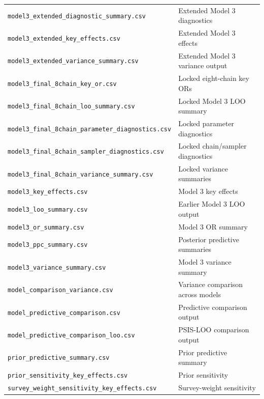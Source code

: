 \begin{longtable}{p{}p{}}
\texttt{model3\_extended\_diagnostic\_summary.csv} & Extended Model 3 diagnostics \\
\texttt{model3\_extended\_key\_effects.csv} & Extended Model 3 effects \\
\texttt{model3\_extended\_variance\_summary.csv} & Extended Model 3 variance output \\
\texttt{model3\_final\_8chain\_key\_or.csv} & Locked eight-chain key ORs \\
\texttt{model3\_final\_8chain\_loo\_summary.csv} & Locked Model 3 LOO summary \\
\texttt{model3\_final\_8chain\_parameter\_diagnostics.csv} & Locked parameter diagnostics \\
\texttt{model3\_final\_8chain\_sampler\_diagnostics.csv} & Locked chain/sampler diagnostics \\
\texttt{model3\_final\_8chain\_variance\_summary.csv} & Locked variance summaries \\
\texttt{model3\_key\_effects.csv} & Model 3 key effects \\
\texttt{model3\_loo\_summary.csv} & Earlier Model 3 LOO output \\
\texttt{model3\_or\_summary.csv} & Model 3 OR summary \\
\texttt{model3\_ppc\_summary.csv} & Posterior predictive summaries \\
\texttt{model3\_variance\_summary.csv} & Model 3 variance summary \\
\texttt{model\_comparison\_variance.csv} & Variance comparison across models \\
\texttt{model\_predictive\_comparison.csv} & Predictive comparison output \\
\texttt{model\_predictive\_comparison\_loo.csv} & PSIS-LOO comparison output \\
\texttt{prior\_predictive\_summary.csv} & Prior predictive summary \\
\texttt{prior\_sensitivity\_key\_effects.csv} & Prior sensitivity \\
\texttt{survey\_weight\_sensitivity\_key\_effects.csv} & Survey-weight sensitivity \\
\bottomrule
\end{longtable}
\normalsize
